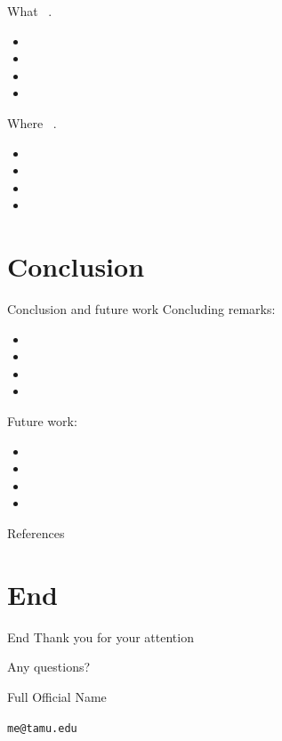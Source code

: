 \documentclass{tamupres/tamupres}
\makeatletter
\newcommand{\fakepoints}[1]{
  \begin{itemize}
  \item \lipsum[#1][1]
  \item \lipsum[#1][2]
  \item \lipsum[#1][3]
  \item \lipsum[#1][4]
  \end{itemize}
}
\def\theauthor{Full Official Name}
\def\theemail{me@tamu.edu}
\makeatother
\begin{document}
\begin{frame}{What}
  \lipsum[10][3]~\cite{mybib2}.
  \fakepoints{5}
\end{frame}

\begin{frame}{Where}
  \lipsum[10][3]~\cite{mybib3}.
  \fakepoints{6}
\end{frame}

\section{Conclusion}
\begin{frame}{Conclusion and future work}
  \alert{Concluding remarks:}
  \fakepoints{7}

  \alert{Future work:}
  \fakepoints{8}
\end{frame}

\begin{frame}{References}
  \tiny
  
  
\end{frame}

\section{End}
\begin{frame}[fragile]{End}
  \centering\large
  Thank you for your attention

  Any questions?

  \vspace{1cm}\footnotesize
  \begin{center}
    \theauthor{}

    \texttt{\theemail{}}
  \end{center}
\end{frame}
\end{document}
